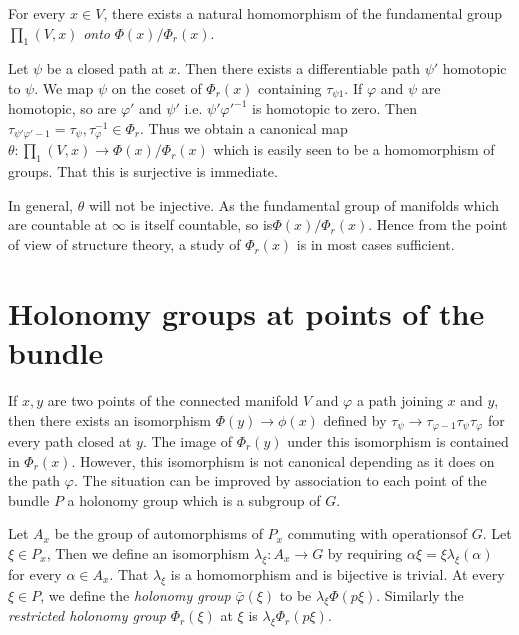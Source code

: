 \setcounter{proposition}{0}
\begin{proposition}\label{chap4:sec3:prop1}%
  For every $x \in V$, there exists a natural homomorphism of the
  fundamental group $\prod _1 (V, x)$ \textit{ onto } $\Phi (x)/
  \Phi_r (x)$. 
\end{proposition}

Let $\psi$ be a closed path at $x$. Then there exists a differentiable
path $\psi'$ homotopic to $\psi$. We map $\psi$ on the coset of
$\Phi_r (x)$ containing $\tau_{\psi 1}$. If $\varphi$ and $\psi$ are
homotopic, so are $\varphi'$ and $\psi'$ i.e. $\psi' \varphi'^{-1}$ is
homotopic to zero. Then $\tau_{\psi' \varphi' -1} = \tau_{\psi},
\tau^{-1}_{\varphi} \in \Phi_r$. Thus we obtain a canonical map
$\theta : \prod_1 (V, x) \to \Phi(x) / \Phi_r (x)$ which is easily
seen to be a homomorphism of groups. That this is surjective is
immediate. 

In general, $\theta$ will not be injective. As the fundamental group
of manifolds which are countable at $\infty$ is itself countable, so
is$ \Phi(x) / \Phi_r (x)$. Hence from the point of view of structure
theory, a study of $\Phi_r(x)$ is in most cases sufficient. 

\section{Holonomy groups at points of the bundle}\label{chap4:sec4}%

If $x, y$ are two points of the connected manifold $V$ and $\varphi$ a
path joining $x$ and $y$, then there exists an isomorphism $\Phi (y)
\to \phi(x)$ defined by $\tau_{\psi} \to \tau_{\varphi -1} \tau_{\psi}
\tau_{\varphi}$ for every path closed at $y$. The image of
$\Phi_r(y)$ under this isomorphism is contained in $\Phi_r
(x)$. However, this isomorphism is not canonical depending as it does
on the path $\varphi$. The situation can be improved by association
to each point of the bundle $P$ a holonomy group which is a subgroup
of $G$. 

Let $A_x$ be the group of automorphisms of $P_x$ commuting with
operations\pageoriginale of $G$. Let $\xi \in P_x$, Then we define an isomorphism
$\lambda_{\xi}: A_x \to G$ by requiring $\alpha \xi = \xi
\lambda_{\xi}(\alpha)$ for every $\alpha \in A_x$. That $\lambda
_{\xi}$ is a homomorphism and is bijective is trivial. At every $\xi
\in P$, we define the \textit{ holonomy group} $\bar{\varphi}(\xi)$ to
be $\lambda_{\xi} \Phi (p \xi)$. Similarly the \textit{restricted
  holonomy group} $\Phi_r (\xi) $ at $\xi $ is $\lambda_{\xi} \Phi_r
(p \xi)$.  

